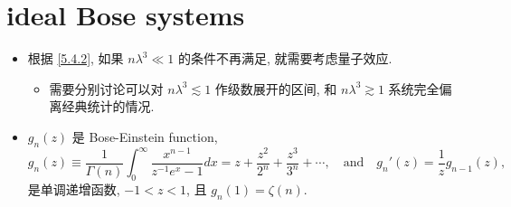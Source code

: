 \chapter{ideal Bose systems} \label{7}
\begin{itemize}
	\item 根据 \eqref{5.4.2}, 如果 $n \lambda^3 \ll 1$ 的条件不再满足, 就需要考虑量子效应.
	\begin{itemize}
		\item 需要分别讨论可以对 $n \lambda^3 \lesssim 1$ 作级数展开的区间, 和 $n \lambda^3 \gtrsim 1$ 系统完全偏离经典统计的情况.
	\end{itemize}
	
	\item $g_n(z)$ 是 Bose-Einstein function,
	\begin{equation}
		g_n(z) \equiv \frac{1}{\Gamma(n)} \int_0^\infty \frac{x^{n - 1}}{z^{- 1} e^x - 1} dx = z + \frac{z^2}{2^n} + \frac{z^3}{3^n} + \cdots, \quad \text{and} \quad g_n'(z) = \frac{1}{z} g_{n - 1}(z),
	\end{equation}
	是单调递增函数, $- 1 < z < 1$, 且 $g_n(1) = \zeta(n)$.
\end{itemize}

